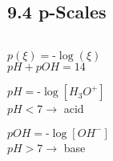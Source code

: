 \subsection{9.4 p-Scales}
\vspace*{-0.5em}
    \begin{center}
        \begin{tabular}{c c c}

        \end{tabular}
        \begin{minipage}{0.99\linewidth}
            \begin{minipage}{0.31\linewidth}
                \center
                $p(\xi) = \mbox{-}\log(\xi)$\\
                $pH + pOH = 14$
            \end{minipage}
            \begin{minipage}{0.34\linewidth}
                \center
                $pH = \mbox{-}\log[H_3O^+]$\\
                $pH < 7 \rightarrow$ acid
            \end{minipage}
            \begin{minipage}{0.33\linewidth}
                \center
                $pOH = \mbox{-}\log[OH^-]$\\
                $pH > 7 \rightarrow$ base
            \end{minipage}
        \end{minipage}
    \end{center}